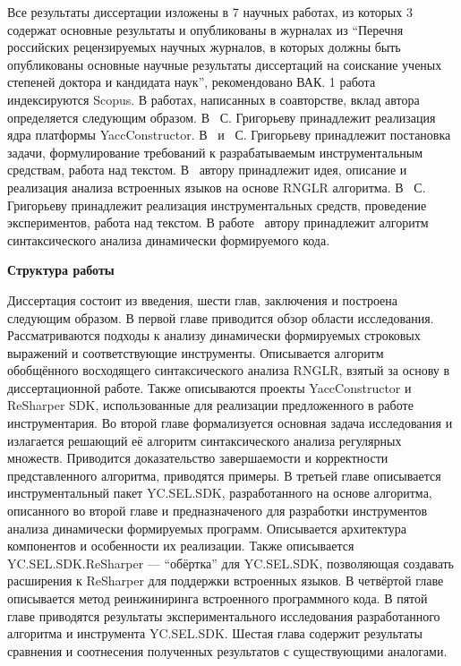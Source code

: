Все результаты диссертации изложены в 7 научных работах, из которых 3~\cite{YCArticle,SELforIDEru,AbstractGLL} содержат основные результаты и опубликованы в журналах из ``Перечня российских рецензируемых научных журналов, в которых должны быть опубликованы основные научные результаты диссертаций на соискание ученых степеней доктора и кандидата наук'', рекомендовано ВАК. 
1 работа~\cite{GLRAbsPars} индексируются Scopus. В работах, написанных в соавторстве, вклад автора определяется следующим образом.  В~\cite{Syrcose} С. Григорьеву принадлежит реализация ядра платформы YaccConstructor. В~\cite{SELforIDEru, AbstractGLL} и~\cite{SELforIDE} С. Григорьеву принадлежит постановка задачи, формулирование требований к разрабатываемым инструментальным средствам, работа над текстом. 
В~\cite{GLRAbsPars} автору принадлежит идея, описание и реализация анализа встроенных языков на основе RNGLR алгоритма.  В~\cite{YCArticle} С. Григорьеву принадлежит реализация инструментальных средств, проведение экспериментов, работа над текстом. В работе~\cite{RelaxedARNGLR} автору принадлежит алгоритм синтаксического анализа динамически формируемого кода.


\textbf{Структура работы}

Диссертация состоит из введения, шести глав, заключения и построена следующим образом. В первой главе приводится обзор области исследования. Рассматриваются подходы к анализу динамически формируемых строковых выражений и соответствующие инструменты. Описывается алгоритм обобщённого восходящего синтаксического анализа RNGLR, взятый за основу в диссертационной работе. Также описываются проекты YaccConstructor и ReSharper SDK, использованные для реализации предложенного в работе инструментария. Во второй главе формализуется основная задача исследования и излагается решающий её алгоритм синтаксического анализа регулярных множеств. Приводится доказательство завершаемости и корректности представленного алгоритма, приводятся примеры. В третьей главе описывается инструментальный пакет YC.SEL.SDK, разработанного на основе алгоритма, описанного во второй главе и предназначеного для разработки инструментов анализа динамически формируемых программ. Описывается архитектура компонентов и особенности их реализации. Также описывается YC.SEL.SDK.ReSharper --- ``обёртка'' для YC.SEL.SDK, позволяющая создавать расширения к ReSharper для поддержки встроенных языков. В четвёртой главе описывается метод реинжиниринга встроенного программного кода.  В пятой главе приводятся результаты экспериментального исследования разработанного алгоритма и инструмента YC.SEL.SDK. Шестая глава содержит результаты сравнения и соотнесения полученных результатов с  существующими аналогами.

